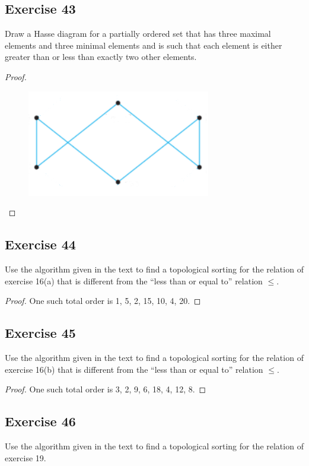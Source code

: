 \documentclass[14pt]{extarticle}
\begin{document}
\subsection{Exercise 43}
Draw a Hasse diagram for a partially ordered set that has three maximal elements and three minimal elements and is
such that each element is either greater than or less than exactly two other elements.

\begin{proof}
        \begin{figure}[ht!]
                \centering
                \includegraphics[scale=0.5]{../images/8.5.43.png}
        \end{figure}
\end{proof}

\subsection{Exercise 44}
Use the algorithm given in the text to find a topological sorting for the relation of exercise 16(a) that is different from the “less than or equal to” relation \(\leq\).

\begin{proof}
        One such total order is 1, 5, 2, 15, 10, 4, 20.
\end{proof}

\subsection{Exercise 45}
Use the algorithm given in the text to find a topological sorting for the relation of exercise 16(b) that is different from the “less than or equal to” relation \(\leq\).

\begin{proof}
        One such total order is 3, 2, 9, 6, 18, 4, 12, 8.
\end{proof}

\subsection{Exercise 46}
Use the algorithm given in the text to find a topological sorting for the relation of exercise 19.
\end{document}
